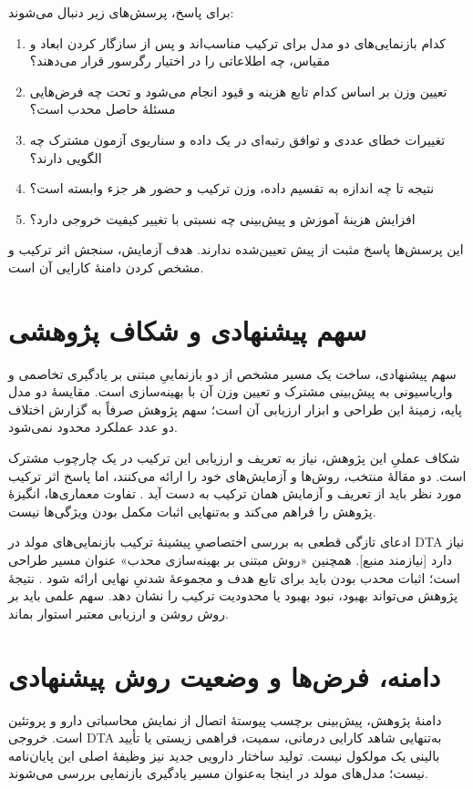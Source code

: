 برای پاسخ، پرسش‌های زیر دنبال می‌شوند:
\begin{enumerate}
\item کدام بازنمایی‌های دو مدل برای ترکیب مناسب‌اند و پس از سازگار کردن ابعاد و مقیاس، چه اطلاعاتی را در اختیار رگرسور قرار می‌دهند؟
\item تعیین وزن بر اساس کدام تابع هزینه و قیود انجام می‌شود و تحت چه فرض‌هایی مسئلهٔ حاصل محدب است؟
\item تغییرات خطای عددی و توافق رتبه‌ای در یک داده و سناریوی آزمون مشترک چه الگویی دارند؟
\item نتیجه تا چه اندازه به تقسیم داده، وزن ترکیب و حضور هر جزء وابسته است؟
\item افزایش هزینهٔ آموزش و پیش‌بینی چه نسبتی با تغییر کیفیت خروجی دارد؟
\end{enumerate}
این پرسش‌ها پاسخ مثبت از پیش تعیین‌شده ندارند. هدف آزمایش، سنجش اثر ترکیب و مشخص کردن دامنهٔ کارایی آن است.

\section{سهم پیشنهادی و شکاف پژوهشی}
\label{sec:noavari}
سهم پیشنهادی، ساخت یک مسیر مشخص از دو بازنماییِ مبتنی بر یادگیری تخاصمی و واریاسیونی به پیش‌بینی مشترک و تعیین وزن آن با بهینه‌سازی است. مقایسهٔ دو مدل پایه، زمینهٔ این طراحی و ابزار ارزیابی آن است؛ سهم پژوهش صرفاً به گزارش اختلاف دو عدد عملکرد محدود نمی‌شود.

شکاف عملیِ این پژوهش، نیاز به تعریف و ارزیابی این ترکیب در یک چارچوب مشترک است. دو مقالهٔ منتخب، روش‌ها و آزمایش‌های خود را ارائه می‌کنند، اما پاسخ اثر ترکیب مورد نظر باید از تعریف و آزمایش همان ترکیب به دست آید \cite{Kalemati24DCGANDTA,Li22CoVAE}. تفاوت معماری‌ها، انگیزهٔ پژوهش را فراهم می‌کند و به‌تنهایی اثبات مکمل بودن ویژگی‌ها نیست.

ادعای تازگی قطعی به بررسی اختصاصیِ پیشینهٔ ترکیب بازنمایی‌های مولد در DTA نیاز دارد [نیازمند منبع]. همچنین «روش مبتنی بر بهینه‌سازی محدب» عنوان مسیر طراحی است؛ اثبات محدب بودن باید برای تابع هدف و مجموعهٔ شدنیِ نهایی ارائه شود \cite{Boyd04ConvexOptimization}. نتیجهٔ پژوهش می‌تواند بهبود، نبود بهبود یا محدودیت ترکیب را نشان دهد. سهم علمی باید بر روش روشن و ارزیابی معتبر استوار بماند.

\section{دامنه، فرض‌ها و وضعیت روش پیشنهادی}
\label{sec:research-boundaries}
دامنهٔ پژوهش، پیش‌بینی برچسب پیوستهٔ اتصال از نمایش محاسباتی دارو و پروتئین است. خروجی DTA به‌تنهایی شاهد کارایی درمانی، سمیت، فراهمی زیستی یا تأیید بالینی یک مولکول نیست. تولید ساختار دارویی جدید نیز وظیفهٔ اصلی این پایان‌نامه نیست؛ مدل‌های مولد در اینجا به‌عنوان مسیر یادگیری بازنمایی بررسی می‌شوند.

